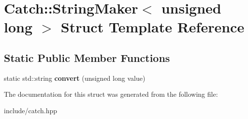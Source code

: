 \hypertarget{structCatch_1_1StringMaker_3_01unsigned_01long_01_4}{}\section{Catch\+:\+:String\+Maker$<$ unsigned long $>$ Struct Template Reference}
\label{structCatch_1_1StringMaker_3_01unsigned_01long_01_4}
\subsection*{Static Public Member Functions}
\begin{DoxyCompactItemize}
\item 
static std\+::string {\bfseries convert} (unsigned long value)\hypertarget{structCatch_1_1StringMaker_3_01unsigned_01long_01_4_ae105dc97e4462a86a61b59667f8423c9}{}\label{structCatch_1_1StringMaker_3_01unsigned_01long_01_4_ae105dc97e4462a86a61b59667f8423c9}

\end{DoxyCompactItemize}


The documentation for this struct was generated from the following file\+:\begin{DoxyCompactItemize}
\item 
include/catch.\+hpp\end{DoxyCompactItemize}
